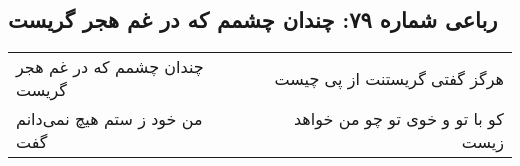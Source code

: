 \begin{center}
\section*{رباعی شماره ۷۹: چندان چشمم که در غم هجر گریست}
\label{sec:sh079}
\begin{longtable}{l p{0.5cm} r}
چندان چشمم که در غم هجر گریست
&&
هرگز گفتی گریستنت از پی چیست
\\
من خود ز ستم هیچ نمی‌دانم گفت
&&
کو با تو و خوی تو چو من خواهد زیست
\\
\end{longtable}
\end{center}
